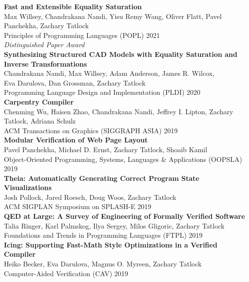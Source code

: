 \documentclass[10pt]{article}
\begin{document}
\textbf{%
  Fast and Extensible Equality Saturation
} \\
Max Willsey, Chandrakana Nandi, Yisu Remy Wang, Oliver Flatt, Pavel Panchekha, Zachary Tatlock \\
Principles of Programming Languages (POPL) 2021 \\
\textit{Distinguished Paper Award} \\

\textbf{%
Synthesizing Structured CAD Models with
Equality Saturation and Inverse Transformations
} \\
Chandrakana Nandi, Max Willsey, Adam Anderson, James R. Wilcox, \\
Eva Darulova, Dan Grossman, Zachary Tatlock \\
Programming Language Design and Implementation (PLDI) 2020 \\

\textbf{%
Carpentry Compiler
} \\
Chenming Wu, Haisen Zhao, Chandrakana Nandi, Jeffrey I. Lipton, Zachary Tatlock, Adriana Schulz \\
ACM Transactions on Graphics (SIGGRAPH ASIA) 2019 \\

\textbf{%
Modular Verification of Web Page Layout
} \\
Pavel Panchekha, Michael D. Ernst, Zachary Tatlock, Shoaib Kamil \\
Object-Oriented Programming, Systems, Languages \& Applications (OOPSLA) 2019 \\

\textbf{%
Theia: Automatically Generating Correct Program State Visualizations
} \\
Josh Pollock, Jared Roesch, Doug Woos, Zachary Tatlock \\
ACM SIGPLAN Symposium on SPLASH-E 2019 \\

\textbf{%
QED at Large: A Survey of Engineering of Formally Verified Software
} \\
Talia Ringer, Karl Palmskog, Ilya Sergey, Milos Gligoric, Zachary Tatlock \\
Foundations and Trends in Programming Languages (FTPL) 2019 \\

\textbf{%
Icing: Supporting Fast-Math Style Optimizations in a Verified Compiler
} \\
Heiko Becker, Eva Darulova, Magnus O. Myreen, Zachary Tatlock \\
Computer-Aided Verification (CAV) 2019 \\
\end{document}
